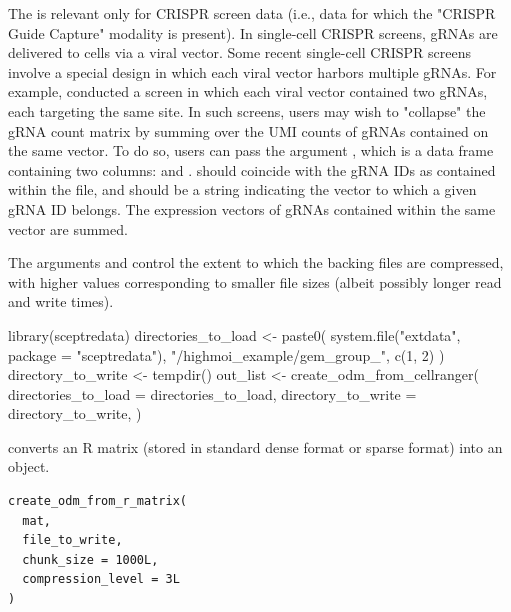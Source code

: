 \documentclass[a4paper]{book}
\begin{document}
\begin{Note}
The  is relevant only for CRISPR screen data (i.e., data for which the "CRISPR Guide Capture" modality is present). In single-cell CRISPR screens, gRNAs are delivered to cells via a viral vector. Some recent single-cell CRISPR screens involve a special design in which each viral vector harbors multiple gRNAs. For example,  conducted a screen in which each viral vector contained two gRNAs, each targeting the same site. In such screens, users may wish to "collapse" the gRNA count matrix by summing over the UMI counts of gRNAs contained on the same vector. To do so, users can pass the argument , which is a data frame containing two columns:  and .  should coincide with the gRNA IDs as contained within the  file, and  should be a string indicating the vector to which a given gRNA ID belongs. The expression vectors of gRNAs contained within the same vector are summed.

The arguments  and  control the extent to which the backing  files are compressed, with higher values corresponding to smaller file sizes (albeit possibly longer read and write times).
\end{Note}
%
\begin{Examples}
\begin{ExampleCode}
library(sceptredata)
directories_to_load <- paste0(
 system.file("extdata", package = "sceptredata"),
 "/highmoi_example/gem_group_", c(1, 2)
)
directory_to_write <- tempdir()
out_list <- create_odm_from_cellranger(
  directories_to_load = directories_to_load,
  directory_to_write = directory_to_write,
)
\end{ExampleCode}
\end{Examples}
%
\begin{Description}
 converts an R matrix (stored in standard dense format or sparse format) into an  object.
\end{Description}
%
\begin{Usage}
\begin{verbatim}
create_odm_from_r_matrix(
  mat,
  file_to_write,
  chunk_size = 1000L,
  compression_level = 3L
)
\end{verbatim}
\end{Usage}
\end{document}
